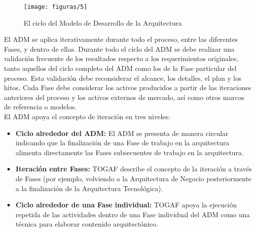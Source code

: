     \begin{figure}[H]
    	\centering
    	\texttt{[image: figuras/5]}
    	\captionsetup{width=.95\textwidth}
    	\caption{El ciclo del Modelo de Desarrollo de la Arquitectura}
    	\label{figura5}
    \end{figure}
    
    El ADM se aplica iterativamente durante todo el proceso, entre las diferentes Fases, y dentro de ellas. Durante todo el ciclo del ADM se debe realizar una validación frecuente de los resultados respecto a los requerimientos originales, tanto aquellos del ciclo completo del ADM como los de la Fase particular del proceso. Esta validación debe reconsiderar el alcance, los detalles, el plan y los hitos. Cada Fase debe considerar los activos producidos a partir de las iteraciones anteriores del proceso y los activos externos de mercado, así como otros marcos de referencia o modelos. \\
    
    El ADM apoya el concepto de iteración en tres niveles:
    \begin{itemize}
    	\item \textbf{Ciclo alrededor del ADM:} El ADM se presenta de manera circular indicando que la finalización de una Fase de trabajo en la arquitectura alimenta directamente las Fases subsecuentes de trabajo en la arquitectura.
    	\item \textbf{Iteración entre Fases:} TOGAF describe el concepto de la iteración a través de Fases (por ejemplo, volviendo a la Arquitectura de Negocio posteriormente a la finalización de la Arquitectura Tecnológica).
    	\item \textbf{Ciclo alrededor de una Fase individual:} TOGAF apoya la ejecución repetida de las actividades dentro de una Fase individual del ADM como una técnica para elaborar contenido arquitectónico.
   \end{itemize}
   
